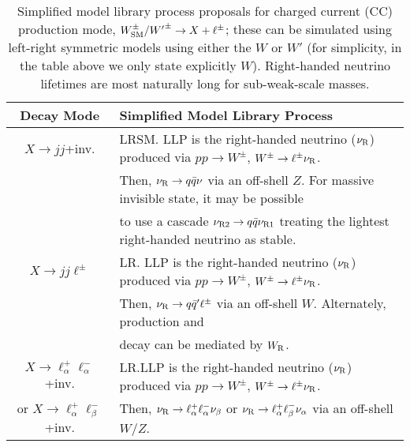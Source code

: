 \begin{table}
\begin{center}
\begin{tabular}{ |c|l|} 
 \hline
Decay Mode & Simplified Model Library Process \\
\hline\hline
$X\rightarrow jj$+inv. & LRSM. LLP is the right-handed neutrino  ($\nu_{\rm R}$)   produced via $pp\rightarrow W^\pm$, $W^\pm\rightarrow \ell^\pm \nu_{\rm R}$.    \\
& Then,   $\nu_{\rm R}\rightarrow q\bar{q}\nu$ via an off-shell $Z$. For massive invisible state, it may be possible   \\
&  to use a cascade $\nu_{\rm R2}\rightarrow q\bar{q}\nu_{\rm R1}$ treating the lightest right-handed neutrino as stable. \\
\hline
$X\rightarrow jj\ell^\pm$& LR. LLP is the right-handed neutrino  ($\nu_{\rm R}$)   produced via $pp\rightarrow W^\pm$, $W^\pm\rightarrow \ell^\pm \nu_{\rm R}$.  \\
& Then,   $\nu_{\rm R}\rightarrow q\bar{q}'\ell^\pm$ via an off-shell $W$. Alternately, production and \\
& decay can be mediated by $W_{\rm R}$.\\
\hline
$X\rightarrow \ell_\alpha^+\ell_\alpha^-$+inv. & LR.LLP is the right-handed neutrino  ($\nu_{\rm R}$)   produced via $pp\rightarrow W^\pm$, $W^\pm\rightarrow \ell^\pm \nu_{\rm R}$.  \\
or $X\rightarrow \ell_\alpha^+\ell_\beta^-$+inv.  & Then,   $\nu_{\rm R}\rightarrow \ell_\alpha^+\ell_\alpha^-\nu_\beta$ or $\nu_{\rm R}\rightarrow \ell_\alpha^+\ell_\beta^-\nu_\alpha$ via an off-shell $W/Z$.\\

\hline
\end{tabular}
\end{center}
\caption{Simplified model library process proposals for charged current (CC) production mode, $W_{\rm SM}^\pm/{W'}^\pm\rightarrow X+\ell^\pm$; these can be simulated using left-right symmetric models using either the $W$ or $W'$ (for simplicity, in the table above we only state explicitly $W$). Right-handed neutrino lifetimes are most naturally long for sub-weak-scale masses. }\label{tab:CC_neutral_library}
\end{table}
